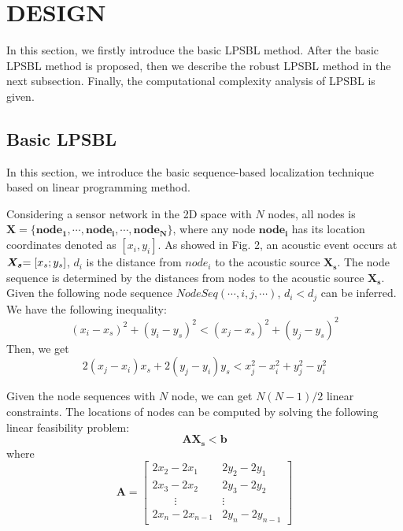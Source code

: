 
\section{DESIGN}

In this section, we firstly introduce the basic LPSBL method.
After the basic LPSBL method is proposed, then we describe the robust LPSBL method in the next subsection.
Finally, the computational complexity analysis of LPSBL is given.

\subsection{Basic LPSBL}

In this section, we introduce the basic sequence-based localization technique based on linear programming method.

Considering a sensor network in the 2D space with $N$ nodes, all nodes is $\bm{X} = \{ \bm{nod{e_1}}, \cdots ,\bm{nod{e_i}}, \cdots ,\bm{nod{e_N}}\}$, 
where any node $\bm{nod{e_i}}$ has its location coordinates denoted as $[{x_i},{y_i}]$. 
As showed in Fig. 2, an acoustic event occurs at $\bm{X_s}{\rm{ = [}}{x_s};{y_s}]$, ${d_i}$ is the distance from $nod{e_i}$ to the acoustic source $\bm{X_s}$.
The node sequence is determined by the distances from nodes to the acoustic source $\bm{X_s}$.
Given the following node sequence $NodeSeq( \cdots ,i,j, \cdots )$, ${d_i}<{d_j}$ can be inferred. We have the following inequality:
 \begin{equation} \label{equation_1}
(x_i-x_s)^2+(y_i-y_s)^2 < (x_j-x_s)^2+(y_j-y_s)^2
 \end{equation}
Then, we get
\begin{equation} \label{equation_2}
2(x_j-x_i)x_s+2(y_j-y_i)y_s<x_j^2-x_i^2+y_j^2-y_i^2
\end{equation}



Given the node sequences with $N$ node, we can get $N(N - 1)/2$ linear constraints. The
locations of nodes can be computed by solving the following linear feasibility problem:
\begin{equation}
\bm {{A}{X_s}}< \bm{{b}}
\end{equation}
where
\[\bm{A} = 
\left[
\begin{array}{lcr}
2x_2-2x_1 & 2y_2-2y_1 \\
2x_3-2x_2 & 2y_3-2y_2 \\
\quad  \quad      \vdots  &   \vdots  \\
2x_n-2x_{n-1} & 2y_n-2y_{n-1}
\end{array}
\right]
\]

